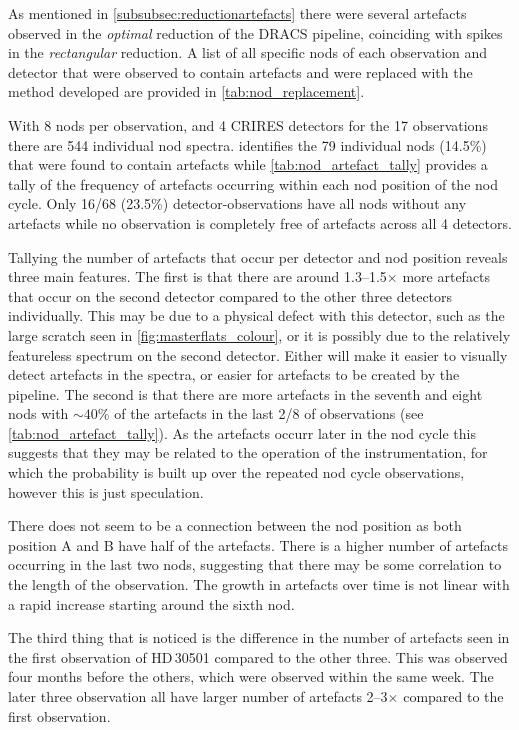As mentioned in \cref{subsubsec:reductionartefacts} there were several artefacts observed in the \emph{optimal} reduction of the {DRACS} pipeline, coinciding with spikes in the \emph{rectangular} reduction.
A list of all specific nods of each observation and detector that were observed to contain artefacts and were replaced with the method developed are provided in \cref{tab:nod_replacement}.

With 8 nods per observation, and 4 {CRIRES} detectors for the 17 observations there are 544 individual nod spectra.
 identifies the 79 individual nods (14.5\%) that were found to contain artefacts while \cref{tab:nod_artefact_tally} provides a tally of the frequency of artefacts occurring within each nod position of the nod cycle.
Only 16/68 (23.5\%) detector-observations have all nods without any artefacts while no observation is completely free of artefacts across all 4 detectors.

Tallying the number of artefacts that occur per detector and nod position reveals three main features.
The first is that there are around 1.3--1.5$\times$ more artefacts that occur on the second detector compared to the other three detectors individually.
This may be due to a physical defect with this detector, such as the large scratch seen in \cref{fig:masterflats_colour}, or it is possibly due to the relatively featureless spectrum on the second detector.
Either will make it easier to visually detect artefacts in the spectra, or easier for artefacts to be created by the pipeline.
The second is that there are more artefacts in the seventh and eight nods with $\sim40$\% of the artefacts in the last 2/8 of observations (see \cref{tab:nod_artefact_tally}).
As the artefacts occurr later in the nod cycle this suggests that they may be related to the operation of the instrumentation, for which the probability is built up over the repeated nod cycle observations, however this is just speculation.

There does not seem to be a connection between the nod position as both position A and B have half of the artefacts.
There is a higher number of artefacts occurring in the last two nods, suggesting that there may be some correlation to the length of the observation.
The growth in artefacts over time is not linear with a rapid increase starting around the sixth nod.

The third thing that is noticed is the difference in the number of artefacts seen in the first observation of HD\,30501 compared to the other three.
This was observed four months before the others, which were observed within the same week.
The later three observation all have larger number of artefacts 2--3$\times$ compared to the first observation.

